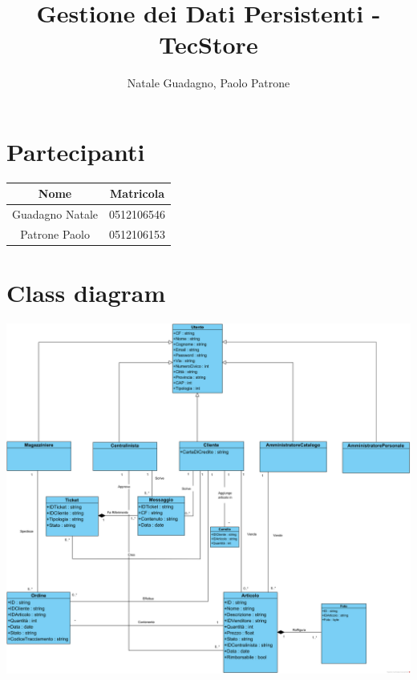 \documentclass[12pt,a4paper]{article}
\author{Natale Guadagno, Paolo Patrone}
\title{Gestione dei Dati Persistenti - TecStore}
\begin{document}
\maketitle
\newpage
\tableofcontents
\newpage
{}
\section*{Partecipanti}
\begin{center}
\begin{tabular} {|c|c|}
\hline
\textbf{Nome} & \textbf{Matricola} \\
\hline
Guadagno Natale & 0512106546 \\
Patrone Paolo & 0512106153 \\
\hline
\end{tabular}
\end{center}
\newpage

\section{Class diagram}
\includegraphics[width=\textwidth]{../RAD/img/DiagrammaDiClasse}
\end{document}
